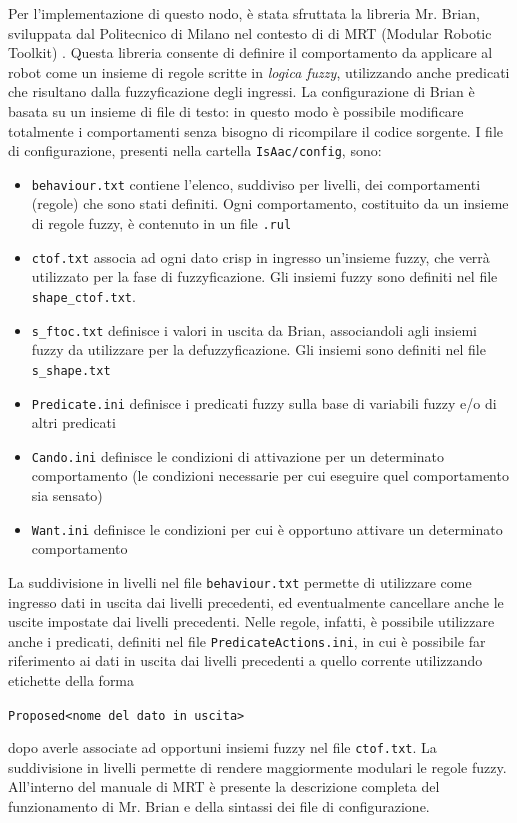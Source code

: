 Per l'implementazione di questo nodo, è stata sfruttata la libreria Mr. Brian, sviluppata dal Politecnico di Milano nel contesto di di MRT (Modular Robotic Toolkit) \cite{mrt}. Questa libreria consente di definire il comportamento da applicare al robot come un insieme di regole scritte in \emph{logica fuzzy}, utilizzando anche predicati che risultano dalla fuzzyficazione degli ingressi. La configurazione di Brian è basata su un insieme di file di testo: in questo modo è possibile modificare totalmente i comportamenti senza bisogno di ricompilare il codice sorgente. I file di configurazione, presenti nella cartella \verb|IsAac/config|, sono:
\begin{itemize}
\item \verb|behaviour.txt| contiene l'elenco, suddiviso per livelli, dei comportamenti (regole) che sono stati definiti. Ogni comportamento, costituito da un insieme di regole fuzzy, è contenuto in un file \verb|.rul|
\item \verb|ctof.txt| associa ad ogni dato crisp in ingresso un'insieme fuzzy, che verrà utilizzato per la fase di fuzzyficazione. Gli insiemi fuzzy sono definiti nel file \verb|shape_ctof.txt|.
\item \verb|s_ftoc.txt| definisce i valori in uscita da Brian, associandoli agli insiemi fuzzy da utilizzare per la defuzzyficazione. Gli insiemi sono definiti nel file \verb|s_shape.txt|
\item \verb|Predicate.ini| definisce i predicati fuzzy sulla base di variabili fuzzy e/o di altri predicati
\item \verb|Cando.ini| definisce le condizioni di attivazione per un determinato comportamento (le condizioni necessarie per cui eseguire quel comportamento sia sensato)
\item \verb|Want.ini| definisce le condizioni per cui è opportuno attivare un determinato comportamento
\end{itemize}
La suddivisione in livelli nel file \verb|behaviour.txt| permette di utilizzare come ingresso dati in uscita dai livelli precedenti, ed eventualmente cancellare anche le uscite impostate dai livelli precedenti. Nelle regole, infatti, è possibile utilizzare anche i predicati, definiti nel file \verb|PredicateActions.ini|, in cui è possibile far riferimento ai dati in uscita dai livelli precedenti a quello corrente utilizzando etichette della forma
\begin{center}\verb|Proposed<nome del dato in uscita>|\end{center}
dopo averle associate ad opportuni insiemi fuzzy nel file \verb|ctof.txt|. La suddivisione in livelli permette di rendere maggiormente modulari le regole fuzzy. All'interno del manuale di MRT \cite{mrtmanual} è presente la descrizione completa del funzionamento di Mr. Brian e della sintassi dei file di configurazione.

